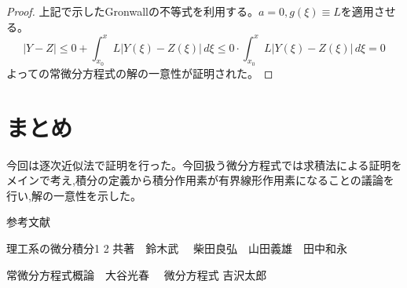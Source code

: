 \documentclass[a4paper]{article}
\begin{document}
\begin{proof}
        上記で示したGronwallの不等式を利用する。$a=0,g(\xi)\equiv L$を適用させる。
        \[\left|Y-Z \right|\leq 0+\displaystyle \int_{x_{0}}^{x} L |Y(\xi) - Z(\xi)| \, d\xi \leq 0\cdot \displaystyle \int_{x_{0}}^{x} L |Y(\xi) - Z(\xi)| \, d\xi =0\]
        よっての常微分方程式の解の一意性が証明された。
    \end{proof}

    \section{まとめ}
    \label{sec:まとめ}
    今回は逐次近似法で証明を行った。今回扱う微分方程式では求積法による証明をメインで考え,積分の定義から積分作用素が有界線形作用素になることの議論を行い,解の一意性を示した。

    参考文献

    理工系の微分積分1 2 共著$\quad$鈴木武$\quad$ 柴田良弘$\quad$山田義雄$\quad$田中和永

    常微分方程式概論$\quad$大谷光春  $\quad$微分方程式 吉沢太郎
\end{document}
